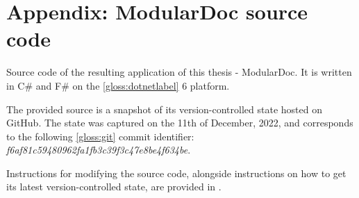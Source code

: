 \section*{Appendix: ModularDoc source code} \label{app:modularDocSourceCode}

Source code of the resulting application of this thesis - ModularDoc.
It is written in C\# and F\# on the \ref{gloss:dotnetlabel} 6 platform.

The provided source is a snapshot of its version-controlled state hosted on GitHub.
The state was captured on the 11th of December, 2022, and corresponds to the following \ref{gloss:git} commit identifier: \textit{f6af81c59480962fa1fb3c39f3c47e8be4f634be}.

Instructions for modifying the source code, alongside instructions on how to get its latest version-controlled state, are provided in .
